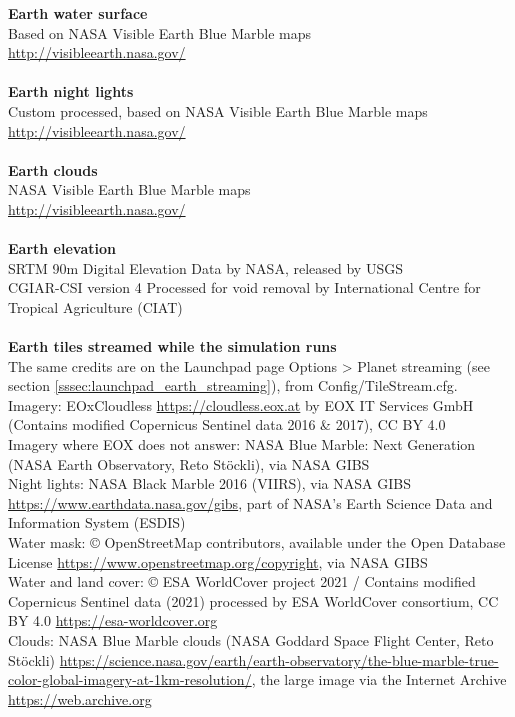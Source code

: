 \documentclass[Orbiter User Manual.tex]{subfiles}
\begin{document}
\textbf{Earth water surface}\\
Based on NASA Visible Earth Blue Marble maps\\
\url{http://visibleearth.nasa.gov/}\\
\\
\textbf{Earth night lights}\\
Custom processed, based on NASA Visible Earth Blue Marble maps\\
\url{http://visibleearth.nasa.gov/}\\
\\
\textbf{Earth clouds}\\
NASA Visible Earth Blue Marble maps\\
\url{http://visibleearth.nasa.gov/}\\
\\
\textbf{Earth elevation}\\
SRTM 90m Digital Elevation Data by NASA, released by USGS\\
CGIAR-CSI version 4 Processed for void removal by International Centre for Tropical Agriculture (CIAT)\\
\\
\textbf{Earth tiles streamed while the simulation runs}\\
The same credits are on the Launchpad page Options > Planet streaming (see section \ref{sssec:launchpad_earth_streaming}), from Config/TileStream.cfg.\\
Imagery: EOxCloudless \url{https://cloudless.eox.at} by EOX IT Services GmbH (Contains modified Copernicus Sentinel data 2016 \& 2017), CC BY 4.0\\
Imagery where EOX does not answer: NASA Blue Marble: Next Generation (NASA Earth Observatory, Reto Stöckli), via NASA GIBS\\
Night lights: NASA Black Marble 2016 (VIIRS), via NASA GIBS \url{https://www.earthdata.nasa.gov/gibs}, part of NASA's Earth Science Data and Information System (ESDIS)\\
Water mask: \copyright{} OpenStreetMap contributors, available under the Open Database License \url{https://www.openstreetmap.org/copyright}, via NASA GIBS\\
Water and land cover: \copyright{} ESA WorldCover project 2021 / Contains modified Copernicus Sentinel data (2021) processed by ESA WorldCover consortium, CC BY 4.0 \url{https://esa-worldcover.org}\\
Clouds: NASA Blue Marble clouds (NASA Goddard Space Flight Center, Reto Stöckli) \url{https://science.nasa.gov/earth/earth-observatory/the-blue-marble-true-color-global-imagery-at-1km-resolution/}, the large image via the Internet Archive \url{https://web.archive.org}\\
\end{document}

